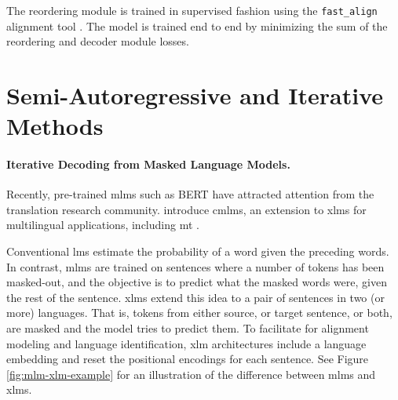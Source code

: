 The reordering module is trained in supervised fashion using the
\texttt{fast\_align} alignment tool \citep{dyer-etal-2013-simple}. The model is
trained end to end by minimizing the sum of the reordering and decoder module
losses.


\section{Semi-Autoregressive and Iterative Methods}%
\label{sec:nat:semi}


\paragraph{Iterative Decoding from Masked Language Models.} Recently,
pre-trained \acp{mlm} such as BERT \citep{devlin-etal-2019-bert} have attracted
attention from the translation research
community. \citet{ghazvininejad-etal-2019-mask} introduce \acp{cmlm}, an
extension to \acp{xlm} for multilingual applications, including \ac{mt}
\citep{conneau-lample-2019-cross}.

Conventional \acp{lm} estimate the probability of a word given the preceding
words.  In contrast, \acp{mlm} are trained on sentences where a number of
tokens has been masked-out, and the objective is to predict what the masked
words were, given the rest of the sentence. \Acp{xlm} extend this idea to a
pair of sentences in two (or more) languages. That is, tokens from either
source, or target sentence, or both, are masked and the model tries to predict
them.  To facilitate for alignment modeling and language identification,
\ac{xlm} architectures include a language embedding and reset the positional
encodings for each sentence. See Figure \ref{fig:mlm-xlm-example} for an
illustration of the difference between \acp{mlm} and \acp{xlm}.

